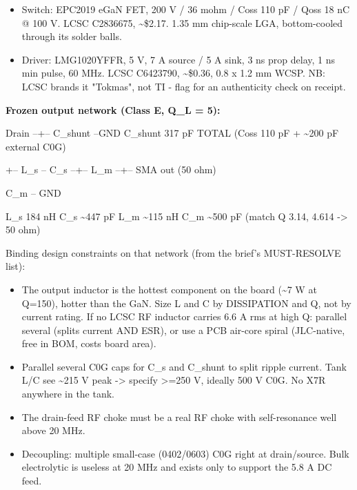 \documentclass[11pt,a4paper]{article}
\begin{document}
\begin{itemize}
\item Switch: EPC2019 eGaN FET, 200 V / 36 mohm / Coss 110 pF / Qoss 18 nC @ 100 V. LCSC C2836675,
\textasciitilde{}\$2.17. 1.35 mm chip-scale LGA, bottom-cooled through its solder balls.
\item Driver: LMG1020YFFR, 5 V, 7 A source / 5 A sink, 3 ns prop delay, 1 ns min pulse, 60 MHz.
LCSC C6423790, \textasciitilde{}\$0.36, 0.8 x 1.2 mm WCSP. NB: LCSC brands it "Tokmas", not TI - flag for an
authenticity check on receipt.
\end{itemize}
\textbf{Frozen output network (Class E, Q\_L = 5):}

Drain --+-- C\_shunt --GND        C\_shunt 317 pF TOTAL (Coss 110 pF + \textasciitilde{}200 pF external C0G)

\begin{quote}\small\ttfamily\raggedright
            \textbar{}
\end{quote}
+-- L\_s -- C\_s --+-- L\_m --+-- SMA out (50 ohm)

\begin{quote}\small\ttfamily\raggedright
                                       \textbar{}
\end{quote}
C\_m -- GND

L\_s 184 nH \textbar{} C\_s \textasciitilde{}447 pF \textbar{} L\_m \textasciitilde{}115 nH \textbar{} C\_m \textasciitilde{}500 pF (match Q 3.14, 4.614 -\textgreater{} 50 ohm)

Binding design constraints on that network (from the brief's MUST-RESOLVE list):

\begin{itemize}
\item The output inductor is the hottest component on the board (\textasciitilde{}7 W at Q=150), hotter than the GaN.
Size L and C by DISSIPATION and Q, not by current rating. If no LCSC RF inductor carries 6.6 A
rms at high Q: parallel several (splits current AND ESR), or use a PCB air-core spiral
(JLC-native, free in BOM, costs board area).
\item Parallel several C0G caps for C\_s and C\_shunt to split ripple current. Tank L/C see \textasciitilde{}215 V peak
-\textgreater{} specify \textgreater{}=250 V, ideally 500 V C0G. No X7R anywhere in the tank.
\item The drain-feed RF choke must be a real RF choke with self-resonance well above 20 MHz.
\item Decoupling: multiple small-case (0402/0603) C0G right at drain/source. Bulk electrolytic is
useless at 20 MHz and exists only to support the 5.8 A DC feed.
\end{itemize}
\end{document}
